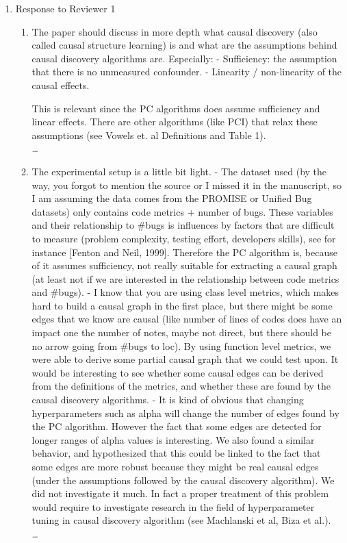 \documentclass[]{svjour3}
\begin{document}
\begin{enumerate}
    \item Response to Reviewer 1
    \begin{enumerate}
        \item The paper should discuss in more depth what causal discovery (also called causal structure learning) is and what are the assumptions behind causal discovery algorithms are.
Especially:
- Sufficiency: the assumption that there is no unmeasured confounder.
- Linearity / non-linearity of the causal effects.

This is relevant since the PC algorithms does assume sufficiency and linear effects. There are other algorithms (like PCI) that relax these assumptions (see Vowels et. al Definitions and Table 1). \\{\MARK \dots}
    \item The experimental setup is a little bit light.
- The dataset used (by the way, you forgot to mention the source or I missed it in the manuscript, so I am assuming the data comes from the PROMISE or Unified Bug datasets) only contains code metrics + number of bugs. These variables and their relationship to #bugs is influences by factors that are difficult to measure (problem complexity, testing effort, developers skills), see for instance [Fenton and Neil, 1999]. Therefore the PC algorithm is, because of it assumes sufficiency, not really suitable for extracting a causal graph (at least not if we are interested in the relationship between code metrics and \#bugs).
- I know that you are using class level metrics, which makes hard to build a causal graph in the first place, but there might be some edges that we know are causal (like number of lines of codes does have an impact one the number of notes, maybe not direct, but there should be no arrow going from #bugs to loc). By using function level metrics, we were able to derive some partial causal graph that we could test upon. It would be interesting to see whether some causal edges can be derived from the definitions of the metrics, and whether these are found by the causal discovery algorithms.
- It is kind of obvious that changing hyperparameters such as alpha will change the number of edges found by the PC algorithm. However the fact that some edges are detected for longer ranges of alpha values is interesting. We also found a similar behavior, and hypothesized that this could be linked to the fact that some edges are more robust because they might be real causal edges (under the assumptions followed by the causal discovery algorithm). We did not investigate it much. In fact a proper treatment of this problem would require to investigate research in the field of hyperparameter tuning in causal discovery algorithm (see Machlanski et al, Biza et al.). \\{\MARK \dots}

\end{enumerate}
\end{enumerate}
\end{document}
